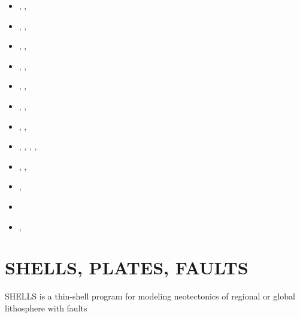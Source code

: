 \begin{small}
\begin{itemize}
                               \textcite{vady10},  \textcite{vayb10}
\item[\twothousandeleven]      \textcite{vahs11},  \textcite{java11},  \textcite{vayj11}
\item[\twothousandtwelve]      \textcite{beva12},  
                               \textcite{chgv12}, \textcite{vakn12}
\item[\twothousandthirteen]    \textcite{ancv13},  \textcite{cibi13},  \textcite{bova13}
\item[\twothousandfourteen]    \textcite{chsg14},  \textcite{mova14},  \textcite{chsv14}
\item[\twothousandfifteen]     \textcite{vasy15},  \textcite{cibi15},  \textcite{mori15}
\item[\twothousandseventeen]   \textcite{civj17},  \textcite{wewv17},  \textcite{mova17}
\item[\twothousandeighteen]    \textcite{spcv18},  \textcite{chss18},  \textcite{mova18}
\item[\twothousandnineteen]    \textcite{zhdv19},  \textcite{vayu19},  \textcite{casv19}, 
                               \textcite{vaws19},  \textcite{cibi19}
\item[\twothousandtwenty]      \textcite{moku20},  \textcite{jomv20},  \textcite{bicc20}
\item[\twothousandtwentyone]   \textcite{pocv21},  \textcite{mota21}
\item[\twothousandtwentythree] \textcite{pocb23}
\item[\twothousandtwentyfour]  \textcite{vapc24},  \textcite{mori24}
\end{itemize}
\end{small}


\section{SHELLS, PLATES, FAULTS} 

SHELLS is a thin-shell program for modeling neotectonics of
regional or global lithosphere with faults

